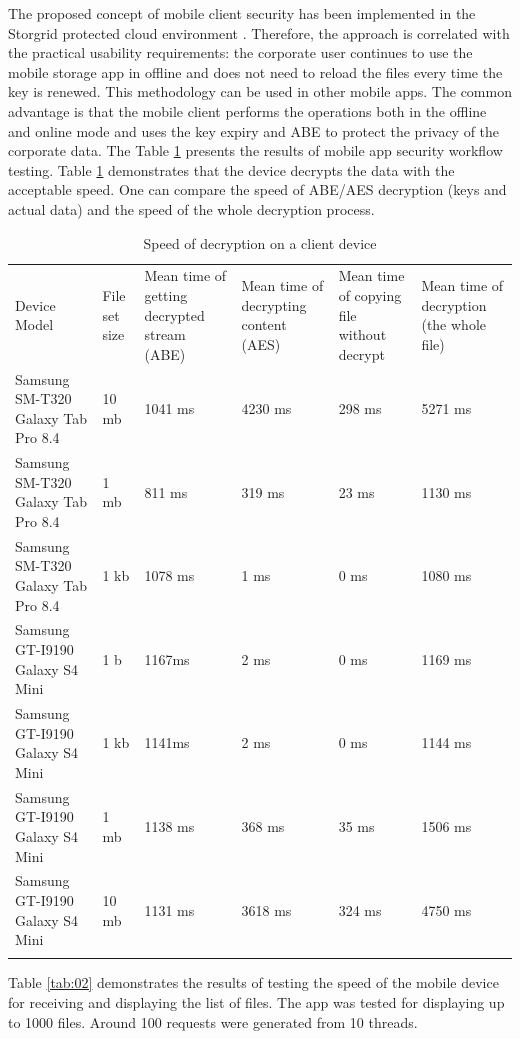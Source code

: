 \documentclass[twocolumn]{svjour3}          	%
\begin{document}
The proposed concept of mobile client security has been implemented in the Storgrid protected cloud environment \cite{storgrid2016}. Therefore, the approach is correlated with the practical usability requirements:  the corporate user continues to use the mobile storage app in offline and does not need to reload the files every time the key is renewed. This methodology can be used in other mobile apps. The common advantage is that the mobile client performs the operations both in the offline and online mode and uses the key expiry and ABE to protect the privacy of the corporate data. The Table \ref{tab:01} presents the results of mobile app security workflow testing. Table \ref{tab:01} demonstrates that the device decrypts the data with the acceptable speed. One can compare the speed of ABE/AES decryption (keys and actual data) and the speed of the whole decryption process.

\begin{table}
	\caption{Speed of decryption on a client device}
	\label{tab:01}
	\centering
	\begin{tabular}{l|l|l|l|l|l}
		Device Model	& File set size	& Mean time of getting decrypted stream (ABE)	& Mean time of decrypting content (AES)	& Mean time of copying file without decrypt	& Mean time of decryption (the whole file)  \\
		\noalign{\smallskip}\hline\noalign{\smallskip}
		Samsung SM-T320 Galaxy Tab Pro 8.4	& 10 mb	& 1041 ms	& 4230 ms	& 298 ms		& 5271 ms	\\
		Samsung SM-T320 Galaxy Tab Pro 8.4	& 1 mb	& 811 ms		& 319 ms		& 23 ms		& 1130 ms	\\
		Samsung SM-T320 Galaxy Tab Pro 8.4	& 1 kb	& 1078 ms	& 1 ms		& 0 ms		& 1080 ms	\\
		Samsung GT-I9190 Galaxy S4 Mini		& 1 b	& 1167ms		& 2 ms		& 0 ms		& 1169 ms	\\
		Samsung GT-I9190 Galaxy S4 Mini		& 1 kb	& 1141ms		& 2 ms		& 0 ms		& 1144 ms	\\
		Samsung GT-I9190 Galaxy S4 Mini		& 1 mb	& 1138 ms	& 368 ms		& 35 ms		& 1506 ms	\\
		Samsung GT-I9190 Galaxy S4 Mini		& 10 mb	& 1131 ms	& 3618 ms	& 324 ms		& 4750 ms	\\
		\noalign{\smallskip}\hline
	\end{tabular}
\end{table}

Table \ref{tab:02} demonstrates the results of testing the speed of the mobile device for receiving and displaying the list of files. The app was tested for displaying up to 1000 files. Around 100 requests were generated from 10 threads.
\end{document}
